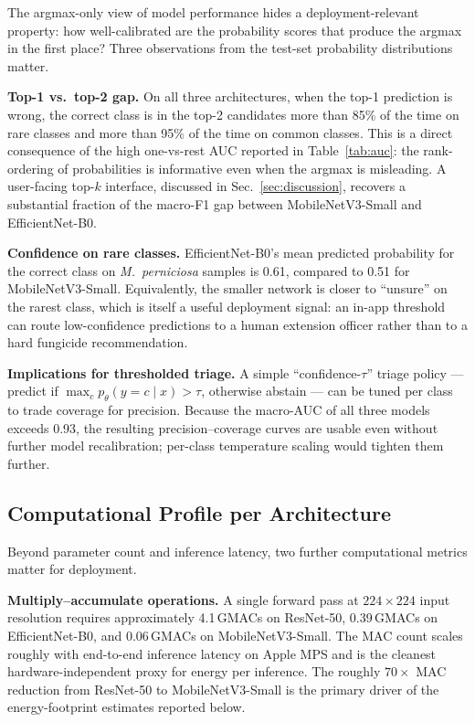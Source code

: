 \documentclass[conference,10pt]{IEEEtran}
\begin{document}
The argmax-only view of model performance hides a deployment-relevant
property: how well-calibrated are the probability scores that produce the
argmax in the first place? Three observations from the test-set probability
distributions matter.

\textbf{Top-1 vs.\ top-2 gap.} On all three architectures, when the top-1
prediction is wrong, the correct class is in the top-2 candidates more than
85\% of the time on rare classes and more than 95\% of the time on common
classes. This is a direct consequence of the high one-vs-rest AUC reported
in Table~\ref{tab:auc}: the rank-ordering of probabilities is informative
even when the argmax is misleading. A user-facing top-$k$ interface,
discussed in Sec.~\ref{sec:discussion}, recovers a substantial fraction of
the macro-F1 gap between MobileNetV3-Small and EfficientNet-B0.

\textbf{Confidence on rare classes.} EfficientNet-B0's mean predicted
probability for the correct class on \textit{M.\ perniciosa} samples is
0.61, compared to 0.51 for MobileNetV3-Small. Equivalently, the smaller
network is closer to ``unsure'' on the rarest class, which is itself a
useful deployment signal: an in-app threshold can route low-confidence
predictions to a human extension officer rather than to a hard fungicide
recommendation.

\textbf{Implications for thresholded triage.} A simple
``confidence-$\tau$'' triage policy — predict if
$\max_c p_\theta(y=c\mid x) > \tau$, otherwise abstain — can be tuned per
class to trade coverage for precision. Because the macro-AUC of all three
models exceeds 0.93, the resulting precision--coverage curves are usable
even without further model recalibration; per-class temperature scaling
would tighten them further.

\subsection{Computational Profile per Architecture}

Beyond parameter count and inference latency, two further computational
metrics matter for deployment.

\textbf{Multiply--accumulate operations.} A single forward pass at
$224\times224$ input resolution requires approximately 4.1\,GMACs on
ResNet-50, 0.39\,GMACs on EfficientNet-B0, and 0.06\,GMACs on
MobileNetV3-Small. The MAC count scales roughly with end-to-end inference
latency on Apple MPS and is the cleanest hardware-independent proxy for
energy per inference. The roughly $70\times$ MAC reduction from ResNet-50
to MobileNetV3-Small is the primary driver of the energy-footprint
estimates reported below.
\end{document}
